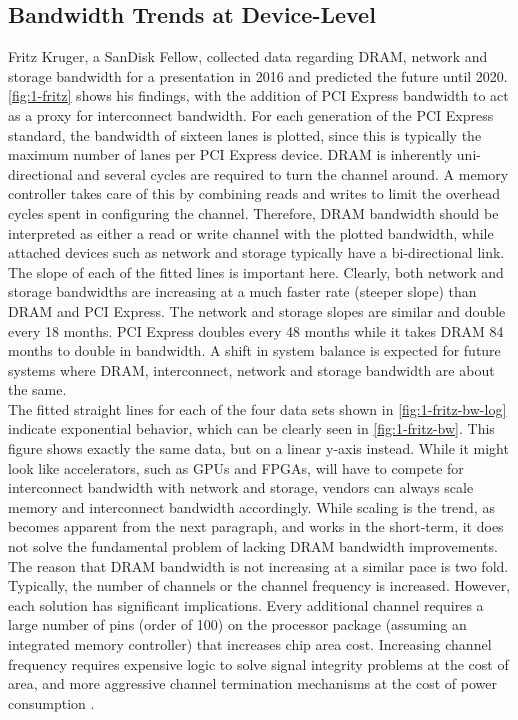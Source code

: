 \subsection{Bandwidth Trends at Device-Level}
Fritz Kruger, a SanDisk Fellow, collected data regarding DRAM, network and storage bandwidth for a presentation in 2016 and predicted the future until 2020. \autoref{fig:1-fritz} shows his findings, with the addition of PCI Express bandwidth to act as a proxy for interconnect bandwidth. For each generation of the PCI Express standard, the bandwidth of sixteen lanes is plotted, since this is typically the maximum number of lanes per PCI Express device. DRAM is inherently uni-directional and several cycles are required to turn the channel around. A memory controller takes care of this by combining reads and writes to limit the overhead cycles spent in configuring the channel. Therefore, DRAM bandwidth should be interpreted as either a read or write channel with the plotted bandwidth, while attached devices such as network and storage typically have a bi-directional link.\\
The slope of each of the fitted lines is important here. Clearly, both network and storage bandwidths are increasing at a much faster rate (steeper slope) than DRAM and PCI Express. The network and storage slopes are similar and double every 18 months. PCI Express doubles every 48 months while it takes DRAM 84 months to double in bandwidth. A shift in system balance is expected for future systems where DRAM, interconnect, network and storage bandwidth are about the same.\\
The fitted straight lines for each of the four data sets shown in \autoref{fig:1-fritz-bw-log} indicate exponential behavior, which can be clearly seen in \autoref{fig:1-fritz-bw}. This figure shows exactly the same data, but on a linear y-axis instead. While it might look like accelerators, such as GPUs and FPGAs, will have to compete for interconnect bandwidth with network and storage, vendors can always scale memory and interconnect bandwidth accordingly. While scaling is the trend, as becomes apparent from the next paragraph, and works in the short-term, it does not solve the fundamental problem of lacking DRAM bandwidth improvements.\\
The reason that DRAM bandwidth is not increasing at a similar pace is two fold. Typically, the number of channels or the channel frequency is increased. However, each solution has significant implications. Every additional channel requires a large number of pins (order of 100) on the processor package (assuming an integrated memory controller) that increases chip area cost. Increasing channel frequency requires expensive logic to solve signal integrity problems at the cost of area, and more aggressive channel termination mechanisms at the cost of power consumption \cite{dram-1, dram-2}.


